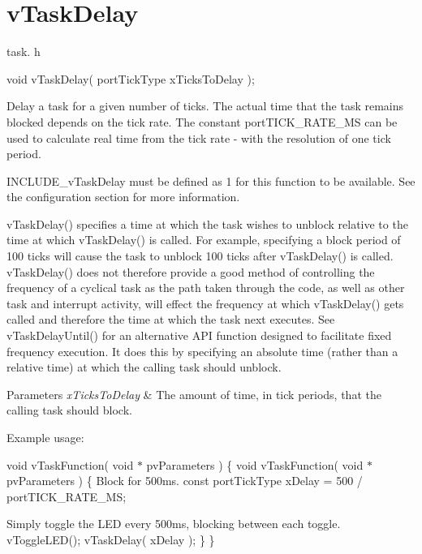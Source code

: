 \hypertarget{group__v_task_delay}{\section{v\-Task\-Delay}
\label{group__v_task_delay}
}
task. h 
\begin{DoxyPre}void vTaskDelay( portTickType xTicksToDelay );\end{DoxyPre}


Delay a task for a given number of ticks. The actual time that the task remains blocked depends on the tick rate. The constant port\-T\-I\-C\-K\-\_\-\-R\-A\-T\-E\-\_\-\-M\-S can be used to calculate real time from the tick rate -\/ with the resolution of one tick period.

I\-N\-C\-L\-U\-D\-E\-\_\-v\-Task\-Delay must be defined as 1 for this function to be available. See the configuration section for more information.

v\-Task\-Delay() specifies a time at which the task wishes to unblock relative to the time at which v\-Task\-Delay() is called. For example, specifying a block period of 100 ticks will cause the task to unblock 100 ticks after v\-Task\-Delay() is called. v\-Task\-Delay() does not therefore provide a good method of controlling the frequency of a cyclical task as the path taken through the code, as well as other task and interrupt activity, will effect the frequency at which v\-Task\-Delay() gets called and therefore the time at which the task next executes. See v\-Task\-Delay\-Until() for an alternative A\-P\-I function designed to facilitate fixed frequency execution. It does this by specifying an absolute time (rather than a relative time) at which the calling task should unblock.


\begin{DoxyParams}{Parameters}
{\em x\-Ticks\-To\-Delay} & The amount of time, in tick periods, that the calling task should block.\\
\hline
\end{DoxyParams}
Example usage\-:

void v\-Task\-Function( void $\ast$ pv\-Parameters ) \{ void v\-Task\-Function( void $\ast$ pv\-Parameters ) \{ Block for 500ms. const port\-Tick\-Type x\-Delay = 500 / port\-T\-I\-C\-K\-\_\-\-R\-A\-T\-E\-\_\-\-M\-S; \begin{DoxyVerb}    for( ;; )
    {
\end{DoxyVerb}
 Simply toggle the L\-E\-D every 500ms, blocking between each toggle. v\-Toggle\-L\-E\-D(); v\-Task\-Delay( x\-Delay ); \} \} 